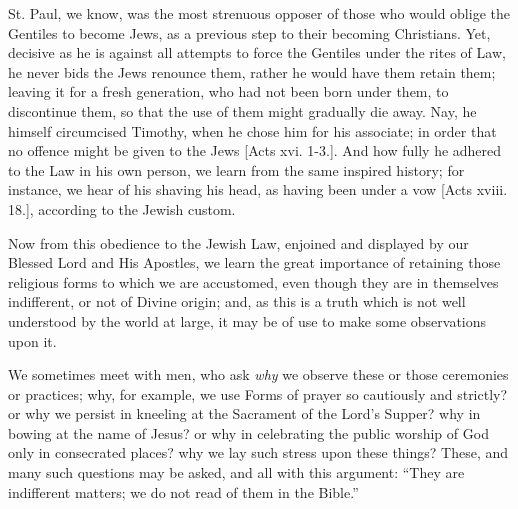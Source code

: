 St. Paul, we know, was the most strenuous opposer of those who
would oblige the Gentiles to become Jews, as a previous step to their
becoming Christians. Yet, decisive as he is against all attempts to
force the Gentiles under the rites of Law, he never bids the Jews
renounce them, rather he would have them retain them; leaving it for a
fresh generation, who had not been born under them, to discontinue
them, so that the use of them might gradually die away. Nay, he
himself circumcised Timothy, when he chose him for his associate; in
order that no offence might be given to the Jews [Acts xvi. 1-3.]. And
how fully he adhered to the Law in his own person, we learn from the
same inspired history; for instance, we hear of his shaving his head,
as having been under a vow [Acts xviii. 18.], according to the Jewish
custom.

Now from this obedience to the Jewish Law, enjoined and displayed
by our Blessed Lord and His Apostles, we learn the great importance of
retaining those religious forms to which we are accustomed, even
though they are in themselves indifferent, or not of Divine origin;
and, as this is a truth which is not well understood by the world at
large, it may be of use to make some observations upon it.

We sometimes meet with men, who ask \emph{why} we observe these or
those ceremonies or practices; why, for example, we use Forms of
prayer so cautiously and strictly? or why we persist in kneeling at
the Sacrament of the Lord's Supper? why in bowing at the name of
Jesus? or why in celebrating the public worship of God only in
consecrated places? why we lay such stress upon these things? These,
and many such questions may be asked, and all with this argument:
``They are indifferent matters; we do not read of them in the
Bible.''

